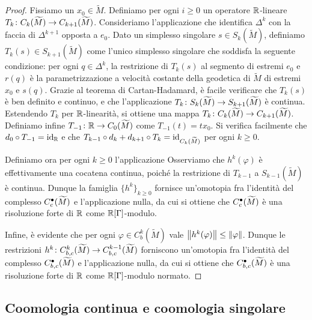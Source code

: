 \begin{proof}
Fissiamo un $x_0\in\widetilde M$. Definiamo per ogni $i\ge 0$ un operatore $\mathbb{R}$-lineare $\map{T_k}{C_k(\widetilde M)}{C_{k+1}(\widetilde M)}$. Consideriamo l'applicazione
che identifica $\Delta^k$ con la faccia di $\Delta^{k+1}$ opposta a $e_0$. Dato un simplesso singolare $s\in S_k(\widetilde M)$, definiamo $T_k(s)\in S_{k+1}(\widetilde M)$ come l'unico simplesso singolare che soddisfa la seguente condizione: per ogni $q\in\Delta^k$, la restrizione di $T_k(s)$ al segmento di estremi $e_0$ e $r(q)$ è la parametrizzazione a velocità costante della geodetica di $\widetilde M$ di estremi $x_0$ e $s(q)$. Grazie al teorema di Cartan-Hadamard, è facile verificare che $T_k(s)$ è ben definito e continuo, e che l'applicazione $\map{T_k}{S_k(\widetilde M)}{S_{k+1}(\widetilde M)}$ è continua. Estendendo $T_k$ per $\mathbb{R}$-linearità, si ottiene una mappa $\map{T_k}{C_k(\widetilde M)}{C_{k+1}(\widetilde M)}$. Definiamo infine $\map{T_{-1}}{\RR}{C_0(\widetilde M)}$ come $T_{-1}(t)=tx_0$. Si verifica facilmente che $d_0\circ T_{-1}=\operatorname{id}_{\mathbb{R}}$ e che $T_{k-1}\circ d_k+d_{k+1}\circ T_k=\operatorname{id}_{C_k(\widetilde M)}$ per ogni $k\ge 0$.

Definiamo ora per ogni $k\ge 0$ l'applicazione
Osserviamo che $h^k(\varphi)$ è effettivamente una cocatena continua, poiché la restrizione di $T_{k-1}$ a $S_{k-1}(\widetilde M)$ è continua. Dunque la famiglia $\{h^k\}_{k\ge 0}$ fornisce un'omotopia fra l'identità del complesso $C^\bullet_c(\widetilde M)$ e l'applicazione nulla, da cui si ottiene che $C^\bullet_c(\widetilde M)$ è una risoluzione forte di $\mathbb{R}$ come $\mathbb{R}[\Gamma]$-modulo.

Infine, è evidente che per ogni $\varphi\in C^k_b(\widetilde M)$ vale $\left\lVert h^k(\varphi)\right\rVert\le\left\lVert \varphi\right\rVert$. Dunque le restrizioni $\map{h^k}{C^k_{b,c}(\widetilde M)}{C^{k-1}_{b,c}(\widetilde M)}$ forniscono un'omotopia fra l'identità del complesso $C^\bullet_{b,c}(\widetilde M)$ e l'applicazione nulla, da cui si ottiene che $C^\bullet_{b,c}(\widetilde M)$ è una risoluzione forte di $\mathbb{R}$ come $\mathbb{R}[\Gamma]$-modulo normato.
\end{proof}

\subsection{Coomologia continua e coomologia singolare}

